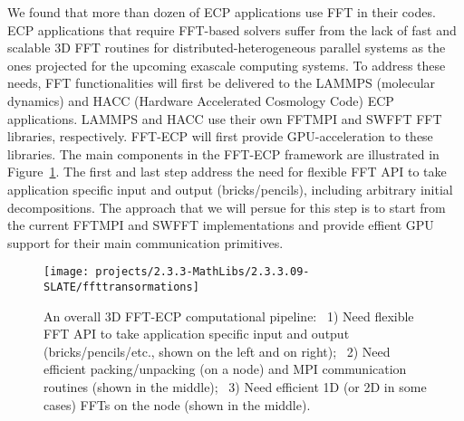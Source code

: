We found that more than dozen of ECP applications use FFT in their codes.
ECP applications that require FFT-based solvers suffer from the lack of 
fast and scalable 3D FFT routines for distributed-heterogeneous parallel 
systems as the ones projected for the upcoming exascale computing systems. 
To address these needs, FFT functionalities will first be delivered 
to the LAMMPS (molecular dynamics) and HACC (Hardware Accelerated
Cosmology Code) ECP applications. 
LAMMPS and HACC use their own FFTMPI and SWFFT FFT libraries, respectively.
FFT-ECP will first provide GPU-acceleration to these libraries.
The main components in the FFT-ECP framework are illustrated in 
Figure~\ref{fig:fft-ecp-pipeline}. The first and last step address the need 
for flexible FFT API to take application specific input and output (bricks/pencils), 
including arbitrary initial decompositions. The approach that we will persue for 
this step is to start from the current FFTMPI and SWFFT implementations and 
provide effient GPU support for their main communication primitives. 

\begin{figure}[htb]
    \centering
    \texttt{[image: projects/2.3.3-MathLibs/2.3.3.09-SLATE/ffttransormations]}
    \caption{\label{fig:fft-ecp-pipeline}
    An overall 3D FFT-ECP computational pipeline:~
      1) Need flexible FFT API to take application specific input and output
         (bricks/pencils/etc., shown on the left and on right);~
      2) Need efficient packing/unpacking (on a node) and MPI communication
         routines (shown in the middle);~
      3) Need efficient 1D (or 2D in some cases) FFTs on the node (shown in the middle).}
\end{figure}

